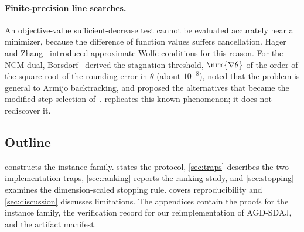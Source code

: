 \paragraph{Finite-precision line searches.}
An objective-value sufficient-decrease test cannot be evaluated accurately near
a minimizer, because the difference of function values suffers cancellation.
Hager and Zhang~\cite{hager2005new} introduced approximate Wolfe conditions
for this reason. For the NCM dual, Borsdorf~\cite[\S4.7.1]{borsdorf2007newton}
derived the stagnation threshold, $\nrm{\nabla\theta}$ of the order of the
square root of the rounding error in $\theta$ (about $10^{-8}$), noted that
the problem is general to Armijo backtracking, and proposed the alternatives
that became the modified step selection of~\cite{borsdorf2010preconditioned}.
 replicates this known phenomenon; it does not rediscover it.

\subsection{Outline}
 constructs the instance family.  states
the protocol, \cref{sec:traps} describes the two implementation traps,
\cref{sec:ranking} reports the ranking study, and \cref{sec:stopping}
examines the dimension-scaled stopping rule.  covers
reproducibility and \cref{sec:discussion} discusses limitations. The
appendices contain the proofs for the instance family, the verification record
for our reimplementation of AGD-SDAJ, and the artifact manifest.

